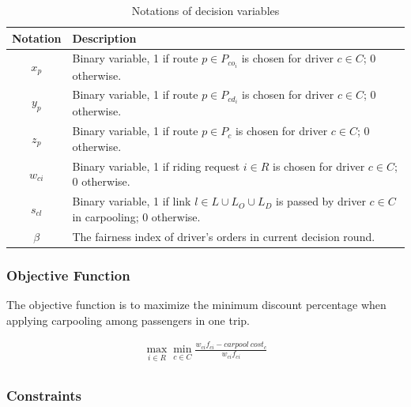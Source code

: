 \begin{longtable}{cp{14cm}}
  \caption{Notations of decision variables}\\
  \toprule
  \multicolumn{1}{l}{Notation}&
  \multicolumn{1}{l}{Description}\\
  \midrule
  \endhead
    $x_{p}$ & Binary variable, 1 if route $p \in P_{co_i}$ is chosen for driver $c \in C$; 0 otherwise. \\
    $y_{p}$ & Binary variable, 1 if route $p \in P_{cd_i}$ is chosen for driver $c \in C$; 0 otherwise. \\
    $z_{p}$ & Binary variable, 1 if route $p \in P_c$ is chosen for driver $c \in C$; 0 otherwise. \\
    $w_{ci}$ & Binary variable, 1 if riding request $i \in R$ is chosen for driver $c \in C$; 0 otherwise. \\
    $s_{cl}$ & Binary variable, 1 if link $l \in L \cup L_O \cup L_D$ is passed by driver $c \in C$ in carpooling; 0 otherwise. \\
    $\beta$ & The fairness index of driver's orders in current decision round. \\
  \bottomrule
\end{longtable}  
\newpage

\subsubsection*{Objective Function}

The objective function is to maximize the minimum discount percentage when applying carpooling among passengers in one trip.

\begin{align*}
  \max_{i \in R} \min_{c \in C} \frac{w_{ci} f_{ci} - carpool\ cost_c}{w_{ci} f_{ci}} \tag{IP1} \\
\end{align*}

\subsubsection*{Constraints}

